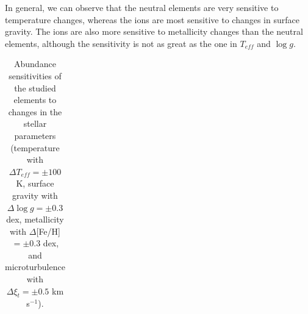 \documentclass[oldversion]{aa}
\begin{document}
In general, we can observe that the neutral elements are very sensitive to temperature changes, whereas the ions are most sensitive to changes in surface gravity. The ions are also more sensitive to metallicity changes than the neutral elements, although the sensitivity is not as great as the one in $T_{eff}$ and $\log g$. %

\begin{table}[t!] %
\caption[]{Abundance sensitivities of the studied elements to changes in the stellar parameters (temperature with $\Delta T_{eff}=\pm100$ K, surface gravity with $\Delta\log g=\pm0.3$ dex, metallicity with $\Delta$[Fe/H] $=\pm0.3$ dex, and microturbulence with $\Delta \xi_t=\pm0.5$ km s$^{-1}$).}
  \label{table:errors}
  \begin{tabular}{ l c c r c c c c c c c c}



\end{tabular}
\end{table}
\end{document}
